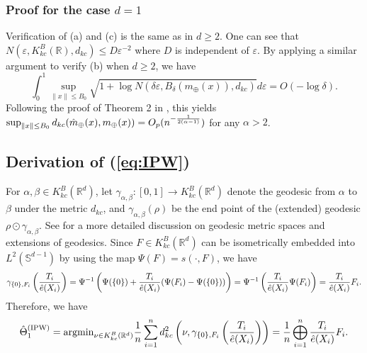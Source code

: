 \documentclass[11pt,reqno]{amsart}
\begin{document}
\subsubsection{Proof for the case $d=1$}

Verification of (a) and (c) is the same as in $d \geq 2$. One can see that $N(\varepsilon, K_{kc}^B(\mathbb{R}),d_{kc})
\leq D\varepsilon^{-2}$ where $D$ is independent of $\varepsilon$. By applying a similar argument to verify (b) when $d \geq 2$, we have 
\[
\int_0^1 \sup_{\|x\|\leq B_0}\sqrt{1 + \log N(\delta\varepsilon, B_\delta(m_\oplus(x)),d_{kc})}d\varepsilon = O(-\log \delta).
\]
Following the proof of Theorem 2 in \cite{PeMu19}, this yields $\sup_{\|x\|\leq B_0}d_{kc}(\hat{m}_\oplus(x),m_\oplus(x)) = O_p(n^{-{1 \over 2(\alpha-1)}})$ for any $\alpha>2$.

\subsection{Derivation of (\ref{eq:IPW})}\label{subsec:app-IPW}

For $\alpha, \beta \in K_{kc}^B(\mathbb{R}^d)$, let $\gamma_{\alpha,\beta}:[0,1] \to K_{kc}^B(\mathbb{R}^d)$ denote the geodesic from $\alpha$ to $\beta$ under the metric $d_{kc}$, and $\gamma_{\alpha,\beta}(\rho)$ be the end point of the (extended) geodesic $\rho \odot \gamma_{\alpha,\beta}$. See \cite{KuZhOtMu24} for a more detailed discussion on geodesic metric spaces and extensions of geodesics. Since $F \in K_{kc}^B(\mathbb{R}^d)$ can be isometrically embedded into $L^2(\mathbb{S}^{d-1})$ by using the map $\Psi(F)=s(\cdot,F)$, we have
\[
\gamma_{\{0\},F_i}\left({T_i \over \hat{e}(X_i)}\right) = \Psi^{-1}\left(\Psi(\{0\})+{T_i \over \hat{e}(X_i)}(\Psi(F_i) -\Psi(\{0\}))\right)
= \Psi^{-1}\left({T_i \over \hat{e}(X_i)}\Psi(F_i)\right)={T_i \over \hat{e}(X_i)}F_i.
\]
Therefore, we have
\begin{align*}
\hat{\Theta}_1^{(\mathrm{IPW})}=\mathrm{argmin}_{\nu \in K_{kc}^B(\mathbb{R}^d)}{1 \over n}\sum_{i=1}^nd_{kc}^2\left(\nu,\gamma_{\{0\},F_i}\left({T_i \over \hat{e}(X_i)}\right)\right) ={1 \over n} \bigoplus_{i=1}^n {T_i \over \hat{e}(X_i)} F_i. 
\end{align*} 
\end{document}
